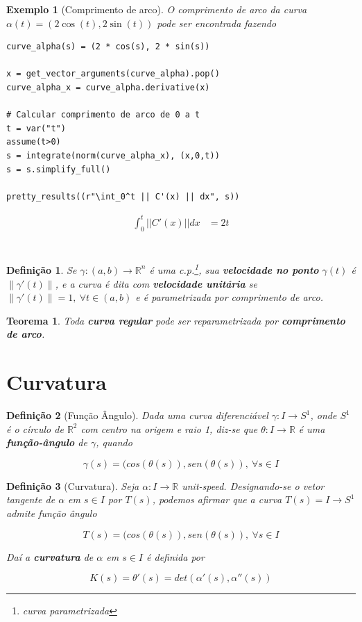 \documentclass[12pt]{article}
\newtheorem{ex}{Exemplo}[section]
\newtheorem{theorem}{Teorema}
\newtheorem{definition}{Definição}
\begin{document}
\begin{ex}[Comprimento de arco] O comprimento de arco da curva $\alpha(t) = (2 \cos(t), 2 \sin(t))$ pode ser encontrada fazendo
\begin{lstlisting}
curve_alpha(s) = (2 * cos(s), 2 * sin(s))

x = get_vector_arguments(curve_alpha).pop()
curve_alpha_x = curve_alpha.derivative(x)
    
# Calcular comprimento de arco de 0 a t
t = var("t")
assume(t>0)
s = integrate(norm(curve_alpha_x), (x,0,t))
s = s.simplify_full()

pretty_results((r"\int_0^t || C'(x) || dx", s))
\end{lstlisting}

\newcommand{\Bold}[1]{\mathbf{#1}}\begin{align*} \int_0^t || C'(x) || dx &= 2t \\ \end{align*} \\
\end{ex}

\begin{definition}
Se $\gamma: (a, b) \rightarrow \mathbb{R}^n$ é uma c.p.\footnote{curva parametrizada}, sua \textbf{velocidade no ponto} $\gamma(t)$ é $\| \gamma'(t) \|$, e a curva é dita com \textbf{velocidade unitária} se $\| \gamma'(t) \| = 1,\ \forall t \in (a, b)$ e é parametrizada por comprimento de arco.
\end{definition}

\begin{theorem}
Toda \textbf{curva regular} pode ser reparametrizada por \textbf{comprimento de arco}.
\end{theorem}

\section{Curvatura}\label{s3}

\begin{definition}[Função Ângulo]
Dada uma curva diferenciável $\gamma: I \rightarrow S^1$, onde $S^1$ é o círculo de $\mathbb{R}^2$ com centro na origem e raio 1, diz-se que $\theta: I \rightarrow \mathbb{R}$ é uma \textbf{função-ângulo} de $\gamma$, quando

$$\gamma(s) = (cos(\theta(s)), sen(\theta(s)),\ \forall s \in I$$
\end{definition}

\begin{definition}[Curvatura]
Seja $\alpha: I \rightarrow \mathbb{R}$ unit-speed. Designando-se o vetor tangente de $\alpha$ em $s \in I$ por $T(s)$, podemos afirmar que a curva $T(s) = I \rightarrow S^1$ admite função ângulo

$$T(s) = (cos(\theta(s)), sen(\theta(s)),\ \forall s \in I$$

Daí a \textbf{curvatura} de $\alpha$ em $s \in I$ é definida por

$$K(s) = \theta'(s) = det(\alpha'(s), \alpha''(s))$$
\end{definition}
\end{document}
